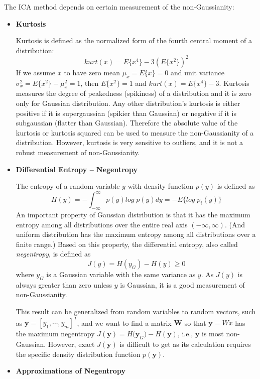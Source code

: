 The ICA method depends on certain measurement of the non-Gaussianity:
\begin{itemize}
\item {\bf Kurtosis}

Kurtosis is defined as the normalized form of the fourth central moment
of a distribution:
\[	kurt(x)=E\{x^4\}-3(E\{x^2\})^2	\]
If we assume $x$ to have zero mean $\mu_x=E\{x\}=0$ and unit variance
$\sigma^2_x=E\{x^2\}-\mu_x^2=1$, then $E\{x^2\}=1$ and $kurt(x)=E\{x^4\}-3$.
Kurtosis measures the degree of peakedness (spikiness) of a distribution
and it is zero only for Gaussian distribution. Any other distribution's
kurtosis is either positive if it is supergaussian (spikier than Gaussian)
or negative if it is subgaussian (flatter than Gaussian). Therefore the
absolute value of the kurtosis or kurtosis squared can be used to measure
the non-Gaussianity of a distribution. However, kurtosis is very sensitive
to outliers, and it is not a robust measurement of non-Gaussianity.


\item {\bf Differential Entropy -- Negentropy}

The entropy of a random variable $y$ with density function $p(y)$ is
defined as
\[	H(y)=-\int_{-\infty}^\infty p(y) log\; p(y) dy
	=-E\{ log \; p_i(y) \}	\]
An important property of Gaussian distribution is that it has the maximum
entropy among all distributions over the entire real axis $(-\infty,\infty)$.
(And uniform distribution has the maximum entropy among all distributions
over a finite range.) Based on this property, the differential entropy,
also called {\em negentropy}, is defined as
\[	J(y)=H(y_G)-H(y) \ge 0	\]
where $y_G$ is a Gaussian variable with the same variance as $y$. As $J(y)$
is always greater than zero unless $y$ is Gaussian, it is a good measurement
of non-Gaussianity.

This result can be generalized from random variables to random vectors,
such as ${\mathbf y}=[y_1,\cdots,y_m]^T$, and we want to find a matrix
${\mathbf W}$ so that ${\mathbf y=Wx}$ has the maximum negentropy
$J({\mathbf y})=H({\mathbf y_G)}-H({\mathbf  y})$, i.e., ${\mathbf y}$ is
most non-Gaussian. However, exact $J({\mathbf y})$ is difficult to get as
its calculation requires the specific density distribution function
$p({\mathbf y})$.

\item {\bf Approximations of Negentropy}


\end{itemize}
